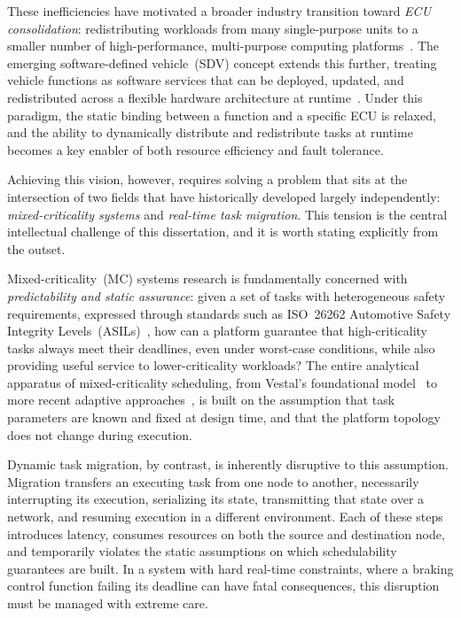 These inefficiencies have motivated a broader industry transition toward \emph{ECU
	consolidation}: redistributing workloads from many single-purpose units to a smaller
number of high-performance, multi-purpose computing platforms~\cite{mckinsey1}. The
emerging software-defined vehicle~(SDV) concept extends this further, treating vehicle
functions as software services that can be deployed, updated, and redistributed across
a flexible hardware architecture at runtime~\cite{autosar_ap2023,pan2024sdv}. %
Under this paradigm, the
static binding between a function and a specific ECU is relaxed, and the ability to
dynamically distribute and redistribute tasks at runtime becomes a key enabler of both
resource efficiency and fault tolerance.

Achieving this vision, however, requires solving a problem that sits at the
intersection of two fields that have historically developed largely independently:
\emph{mixed-criticality systems} and \emph{real-time task migration}. This tension
is the central intellectual challenge of this dissertation, and it is worth stating
explicitly from the outset.

Mixed-criticality~(MC) systems research is fundamentally concerned with
\emph{predictability and static assurance}: given a set of tasks with heterogeneous
safety requirements, expressed through standards such as ISO~26262 Automotive Safety
Integrity Levels~(ASILs)~\cite{iso26262_2018}, how can a platform guarantee that
high-criticality tasks always meet their deadlines, even under worst-case conditions,
while also providing useful service to lower-criticality workloads? The entire
analytical apparatus of mixed-criticality scheduling, from Vestal's foundational
model~\cite{vestal2007} to more recent adaptive approaches~\cite{burns2017}, is built
on the assumption that task parameters are known and fixed at design time, and that
the platform topology does not change during execution.

Dynamic task migration, by contrast, is inherently disruptive to this assumption.
Migration transfers an executing task from one node to another, necessarily
interrupting its execution, serializing its state, transmitting that state over a
network, and resuming execution in a different environment. Each of these steps
introduces latency, consumes resources on both the source and destination node, and
temporarily violates the static assumptions on which schedulability guarantees are
built. In a system with hard real-time constraints, where a braking control
function failing its deadline can have fatal consequences, this disruption must be
managed with extreme care.

